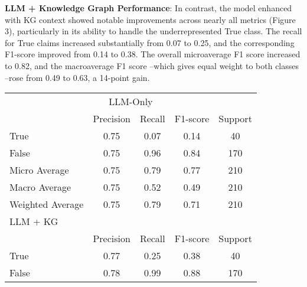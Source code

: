 \documentclass{scrartcl}
\begin{document}
\textbf{LLM + Knowledge Graph Performance}: In contrast, the model enhanced with KG context showed notable improvements across nearly all metrics (Figure 3), particularly in its ability to handle the underrepresented True class. The recall for True claims increased substantially from 0.07 to 0.25, and the corresponding F1-score improved from 0.14 to 0.38. The overall microaverage F1 score increased to 0.82, and the macroaverage F1 score –which gives equal weight to both classes –rose from 0.49 to 0.63, a 14-point gain.


\begin{table}[H]
\begin{center}
\begin{tabular}{lcccc}
\hline
\multicolumn{5}{c}{LLM-Only}                                                                                                               \\
                 & \multicolumn{1}{l}{Precision} & \multicolumn{1}{l}{Recall} & \multicolumn{1}{l}{F1-score} & \multicolumn{1}{l}{Support} \\ \hline
True             & 0.75                          & 0.07                       & 0.14                         & 40                          \\
False            & 0.75                          & 0.96                       & 0.84                         & 170                         \\
Micro Average    & 0.75                          & 0.79                       & 0.77                         & 210                         \\
Macro Average    & 0.75                          & 0.52                       & 0.49                         & 210                         \\
Weighted Average & 0.75                          & 0.79                       & 0.71                         & 210                         \\ \hline
\multicolumn{5}{l}{LLM + KG}                                                                                                               \\ \hline
                 & \multicolumn{1}{l}{Precision} & \multicolumn{1}{l}{Recall} & \multicolumn{1}{l}{F1-score} & \multicolumn{1}{l}{Support} \\
True             & 0.77                          & 0.25                       & 0.38                         & 40                          \\
False            & 0.78                          & 0.99                       & 0.88                         & 170                         \\

\end{tabular}
\end{center}
\end{table}
\end{document}
